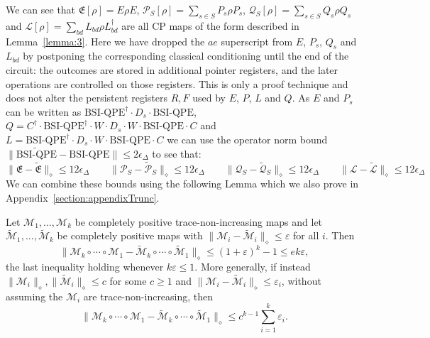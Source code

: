 We can see that $\mathfrak{E}[\rho] =  E \rho E$, $\mathcal{P}_S[\rho] = \sum_{s\in S} P_s \rho P_s$, $\mathcal{Q}_S[\rho] = \sum_{s\in S} Q_s \rho Q_s$ and $\mathcal{L}[\rho] = \sum_{bd} L_{bd} \rho L^{\dagger}_{bd}$ are all CP maps of the form described in Lemma~\ref{lemma:3}. Here we have dropped the $ae$ superscript from $E$, $P_s$, $Q_s$ and $L_{bd}$ by postponing the corresponding classical conditioning until the end of the circuit: the outcomes are stored in additional pointer registers, and the later operations are controlled on those registers. This is only a proof technique and does not alter the persistent registers $R, F$ used by $E$, $P$, $L$ and $Q$. As $E$ and $P_s$ can be written as $\text{BSI-QPE}^{\dagger}\cdot D_s\cdot\text{BSI-QPE}$, $Q = C^{\dagger}\cdot\text{BSI-QPE}^{\dagger}\cdot W\cdot D_s\cdot W\cdot \text{BSI-QPE}\cdot C$ and $L = \text{BSI-QPE}^{\dagger}\cdot D_s\cdot W\cdot \text{BSI-QPE}\cdot C$ we can use the operator norm bound $\|\widetilde{\text{BSI-QPE}}- \text{BSI-QPE}\| \leq 2\epsilon_{\Delta}$ to see that:
\begin{equation}
    \|\mathfrak{E} - \tilde{\mathfrak{E}}\|_{\diamond} \leq 12\epsilon_{\Delta} \qquad\|\mathcal{P}_S - \tilde{\mathcal{P}}_S\|_{\diamond} \leq 12\epsilon_{\Delta} \qquad\|\mathcal{Q}_S - \tilde{\mathcal{Q}}_S\|_{\diamond} \leq 12\epsilon_{\Delta} \qquad\|\mathcal{L} - \tilde{\mathcal{L}}\|_{\diamond} \leq 12\epsilon_{\Delta}
    \label{eq:bound_on_component_maps}
\end{equation}
We can combine these bounds using the following Lemma which we also prove in Appendix~\ref{section:appendixTrunc}.
\begin{lemma}
\label{lemma:composition}
Let $\mathcal{M}_1, \ldots, \mathcal{M}_k$ be completely positive trace-non-increasing maps and let $\tilde{\mathcal{M}}_1, \ldots, \tilde{\mathcal{M}}_k$ be completely positive maps with $\|\mathcal{M}_i - \tilde{\mathcal{M}}_i\|_{\diamond} \leq \varepsilon$ for all $i$. Then
\begin{equation}
    \|\mathcal{M}_k \circ \cdots \circ \mathcal{M}_1 - \tilde{\mathcal{M}}_k \circ \cdots \circ \tilde{\mathcal{M}}_1\|_{\diamond} \leq (1+\varepsilon)^k - 1 \leq e k \varepsilon,
\end{equation}
the last inequality holding whenever $k\varepsilon \leq 1$. More generally, if instead $\|\mathcal{M}_i\|_{\diamond}, \|\tilde{\mathcal{M}}_i\|_{\diamond} \leq c$ for some $c \geq 1$ and $\|\mathcal{M}_i - \tilde{\mathcal{M}}_i\|_{\diamond} \leq \varepsilon_i$, without assuming the $\mathcal{M}_i$ are trace-non-increasing, then
\begin{equation}
    \|\mathcal{M}_k \circ \cdots \circ \mathcal{M}_1 - \tilde{\mathcal{M}}_k \circ \cdots \circ \tilde{\mathcal{M}}_1\|_{\diamond} \leq c^{k-1}\sum_{i=1}^{k}\varepsilon_i .
\end{equation}
\end{lemma}
